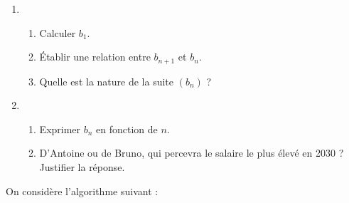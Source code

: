 \par
%
%
\par
\begin{enumerate}
     \par
     \item %
     \par
     \begin{enumerate}[label=\alph*.]
          \item %
          Calculer $b_1$.
          \par
          \item %
          \'Etablir une relation entre $b_{n+1}$ et $b_n$.
          \par
          \item %
          Quelle est la nature de la suite $(b_n)$ ?
          \par
     \end{enumerate}
     \par
     \item %
     \par
     \begin{enumerate}[label=\alph*.]
          \item %
          Exprimer $b_n$ en fonction de $n$.
          \par
          \item %
          D'Antoine ou de Bruno, qui percevra le salaire le plus élevé en 2030 ? Justifier la réponse.
          \par
     \end{enumerate}
     \par
\end{enumerate}
\par
%
%
\par
On considère l'algorithme suivant :
\par
